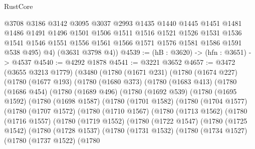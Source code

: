 \begin{lexlean}{RustCore}
\begin{coremodule}
          @3708
          @3186
          @3142
          @3095
          @3037
          @2993
          @1435
          @1440
          @1445
          @1451
          @1481
          @1486
          @1491
          @1496
          @1501
          @1506
          @1511
          @1516
          @1521
          @1526
          @1531
          @1536
          @1541
          @1546
          @1551
          @1556
          @1561
          @1566
          @1571
          @1576
          @1581
          @1586
          @1591
          @538
          @495)
        @4)
      (@3631 @3798 @4))
@4539 := (hB : @3620) -> (hfn : @3651) -> @4537
@4540 := @4292 @1878
@4541 := @3221 @3652
@4657 := @3472
    (@3655 @3213 @1779)
    (@3480
      (@1780
        (@1671 @231)
        (@1780
          (@1674 @227)
          (@1780
            (@1677 @193)
            (@1780
              (@1680 @373)
              (@1780
                (@1683 @413)
                (@1780
                  (@1686 @454)
                  (@1780
                    (@1689 @496)
                    (@1780
                      (@1692 @539)
                      (@1780
                        (@1695 @1592)
                        (@1780
                          (@1698 @1587)
                          (@1780
                            (@1701 @1582)
                            (@1780
                              (@1704 @1577)
                              (@1780
                                (@1707 @1572)
                                (@1780
                                  (@1710 @1567)
                                  (@1780
                                    (@1713 @1562)
                                    (@1780
                                      (@1716 @1557)
                                      (@1780
                                        (@1719 @1552)
                                        (@1780
                                          (@1722 @1547)
                                          (@1780
                                            (@1725 @1542)
                                            (@1780
                                              (@1728 @1537)
                                              (@1780
                                                (@1731 @1532)
                                                (@1780
                                                  (@1734 @1527)
                                                  (@1780
                                                    (@1737 @1522)
                                                    (@1780

\end{coremodule}
\end{lexlean}
